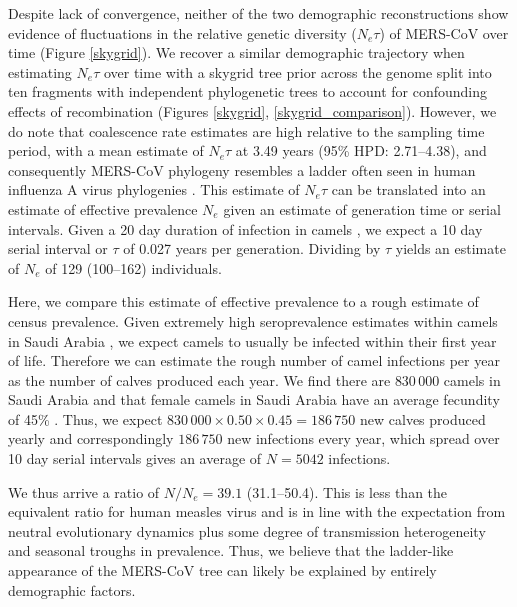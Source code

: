 \documentclass[9pt,lineno]{elife}
\begin{document}
Despite lack of convergence, neither of the two demographic reconstructions show evidence of fluctuations in the relative genetic diversity ($N_e \tau$) of  MERS-CoV over time (Figure \ref{skygrid}).
We recover a similar demographic trajectory when estimating $N_{e}\tau$ over time with a skygrid tree prior across the genome split into ten fragments with independent phylogenetic trees to account for confounding effects of recombination (Figures \ref{skygrid}, \ref{skygrid_comparison}).
However, we do note that coalescence rate estimates are high relative to the sampling time period, with a mean estimate of $N_e\tau$ at 3.49 years (95\% HPD: 2.71--4.38), and consequently MERS-CoV phylogeny resembles a ladder often seen in human influenza A virus phylogenies \citep{bedford_strength_2011}.
This estimate of $N_e\tau$ can be translated into an estimate of effective prevalence $N_e$ given an estimate of generation time or serial intervals.
Given a 20 day duration of infection in camels \citep{adney_replication_2014}, we expect a 10 day serial interval or $\tau$ of 0.027 years per generation.
Dividing by $\tau$ yields an estimate of $N_e$ of 129 (100--162) individuals.

Here, we compare this estimate of effective prevalence to a rough estimate of census prevalence.
Given extremely high seroprevalence estimates within camels in Saudi Arabia \citep{muller_2014,corman_antibodies_2014,chu_2014,reusken_2013,reusken_2014}, we expect camels to usually be infected within their first year of life.
Therefore we can estimate the rough number of camel infections per year as the number of calves produced each year.
We find there are $830\,000$ camels in Saudi Arabia \citep{abdallah_camel_farming_2013} and that female camels in Saudi Arabia have an average fecundity of 45\% \citep{abdallah_camel_farming_2013}.
Thus, we expect $830\,000 \times 0.50 \times 0.45 = 186\,750$ new calves produced yearly and correspondingly $186\,750$ new infections every year, which spread over 10 day serial intervals gives an average of $N = 5042$ infections.

We thus arrive a ratio of $N/N_e = 39.1$ (31.1--50.4).
This is less than the equivalent ratio for human measles virus \citep{bedford_strength_2011} and is in line with the expectation from neutral evolutionary dynamics plus some degree of transmission heterogeneity \citep{volz_phylodynamics_2013} and seasonal troughs in prevalence.
Thus, we believe that the ladder-like appearance of the MERS-CoV tree can likely be explained by entirely demographic factors.
\end{document}
